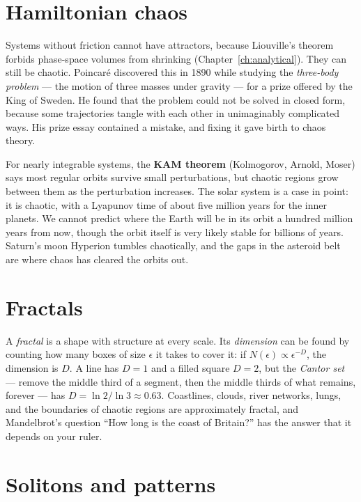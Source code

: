 \section{Hamiltonian chaos}

Systems without friction cannot have attractors, because Liouville's theorem forbids phase-space volumes from shrinking (Chapter~\ref{ch:analytical}). They can still be chaotic. Poincar\'e discovered this in 1890 while studying the \emph{three-body problem} --- the motion of three masses under gravity --- for a prize offered by the King of Sweden. He found that the problem could not be solved in closed form, because some trajectories tangle with each other in unimaginably complicated ways. His prize essay contained a mistake, and fixing it gave birth to chaos theory.

For nearly integrable systems, the \textbf{KAM theorem} (Kolmogorov, Arnold, Moser) says most regular orbits survive small perturbations, but chaotic regions grow between them as the perturbation increases. The solar system is a case in point: it is chaotic, with a Lyapunov time of about five million years for the inner planets. We cannot predict where the Earth will be in its orbit a hundred million years from now, though the orbit itself is very likely stable for billions of years. Saturn's moon Hyperion tumbles chaotically, and the gaps in the asteroid belt are where chaos has cleared the orbits out.

\section{Fractals}

A \emph{fractal} is a shape with structure at every scale. Its \emph{dimension} can be found by counting how many boxes of size $\epsilon$ it takes to cover it: if $N(\epsilon)\propto\epsilon^{-D}$, the dimension is $D$. A line has $D = 1$ and a filled square $D = 2$, but the \emph{Cantor set} --- remove the middle third of a segment, then the middle thirds of what remains, forever --- has $D = \ln2/\ln3\approx0.63$. Coastlines, clouds, river networks, lungs, and the boundaries of chaotic regions are approximately fractal, and Mandelbrot's question ``How long is the coast of Britain?'' has the answer that it depends on your ruler.

\section{Solitons and patterns}

